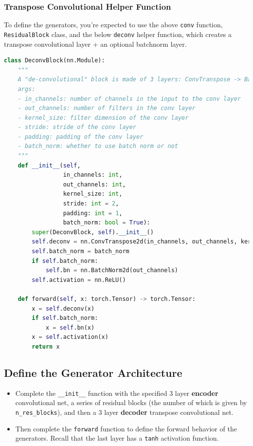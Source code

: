 \subsubsection{Transpose Convolutional Helper Function}

To define the generators, you're expected to use the above
\lstinline{conv} function,
\lstinline{ResidualBlock} class, and the below
\lstinline{deconv} helper function, which creates a
transpose convolutional layer + an optional batchnorm layer.

\begin{lstlisting}[language=Python]
class DeconvBlock(nn.Module):
    """
    A "de-convolutional" block is made of 3 layers: ConvTranspose -> BatchNorm -> Activation.
    args:
    - in_channels: number of channels in the input to the conv layer
    - out_channels: number of filters in the conv layer
    - kernel_size: filter dimension of the conv layer
    - stride: stride of the conv layer
    - padding: padding of the conv layer
    - batch_norm: whether to use batch norm or not
    """
    def __init__(self, 
                 in_channels: int, 
                 out_channels: int, 
                 kernel_size: int, 
                 stride: int = 2,
                 padding: int = 1,
                 batch_norm: bool = True):
        super(DeconvBlock, self).__init__()
        self.deconv = nn.ConvTranspose2d(in_channels, out_channels, kernel_size, stride, padding, bias=False)
        self.batch_norm = batch_norm
        if self.batch_norm:
            self.bn = nn.BatchNorm2d(out_channels)
        self.activation = nn.ReLU()
        
    def forward(self, x: torch.Tensor) -> torch.Tensor:
        x = self.deconv(x)
        if self.batch_norm:
            x = self.bn(x)
        x = self.activation(x)
        return x
\end{lstlisting}

\subsection{Define the Generator Architecture}

\begin{itemize}
\item Complete the \lstinline{__init__} function with the
  specified 3 layer \textbf{encoder} convolutional net, a series of
  residual blocks (the number of which is given by
  \lstinline{n_res_blocks}), and then a 3 layer
  \textbf{decoder} transpose convolutional net.
\item Then complete the \lstinline{forward} function to define
  the forward behavior of the generators. Recall that the last layer has
  a \lstinline{tanh} activation function.
\end{itemize}

